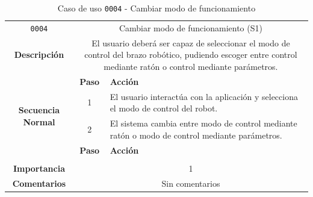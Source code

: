 \begin{table}[H]
    \centering
    \begin{tabularx}{\textwidth}{|c|c|X|}
        \cline{1-3}
        \texttt{0004}                              & \multicolumn{2}{c|}{Cambiar modo de funcionamiento (S1)}                                                                                                                      \\ \cline{1-3}
        \textbf{Descripción}                       & \multicolumn{2}{m{13cm}|}{El usuario deberá ser capaz de seleccionar el modo de control del brazo robótico, pudiendo escoger entre control mediante ratón o control mediante parámetros. }
        \\ \cline{1-3}
        \multirow{4}{*}{\textbf{Secuencia Normal}} & \textbf{Paso}                                                                                                                                        & \textbf{Acción}
        \\ \cline{2-3}                    &   1  & El usuario interactúa con la aplicación y selecciona el modo de control del robot.
        \\ \cline{2-3}                    &   2  & El sistema cambia entre modo de control mediante ratón o modo de control mediante parámetros.
        \\ \cline{1-3}
        \multirow{2}{*}{\textbf{Excepciones}}      & \textbf{Paso}                                                                                                                                        & \textbf{Acción}
        \\ \cline{2-3}                    &     & 
        \\ \cline{1-3}
        \textbf{Importancia}                       & \multicolumn{2}{c|}{1}                                                                                                                                                 \\ \cline{1-3}
        \textbf{Comentarios}                       & \multicolumn{2}{c|}{Sin comentarios}                                                                                                                                   \\ \cline{1-3}
    \end{tabularx}
    \caption{Caso de uso \texttt{0004} - Cambiar modo de funcionamiento}
\end{table}
